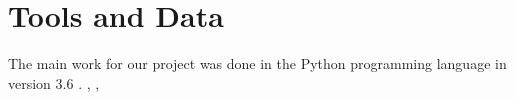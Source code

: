 \section{Tools and Data}\label{sec:toolsanddata}
The main work for our project was done in the Python programming language in version 3.6 \cite{python}. \cite{gmaps},  \cite{matplotlib} \cite{jupyter}, \cite{requests}
